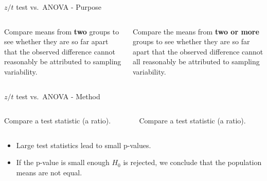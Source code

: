 \documentclass[
  ignorenonframetext,
]{beamer}
\begin{document}
\begin{frame}{\(z/t\) test vs.~ANOVA - Purpose}
\protect\hypertarget{zt-test-vs.-anova---purpose}{}
\begin{columns}

\begin{column}{0.45\textwidth}

\raggedright Compare means from \textbf{two} groups to see whether they are so far apart that the observed difference cannot reasonably be attributed to sampling variability.


\end{column}

\begin{column}{0.45\textwidth}

\raggedright Compare the means from \textbf{two or more} groups to see whether they are so far apart that the observed difference cannot all reasonably be attributed to sampling variability.


\end{column}

\end{columns}
\end{frame}

\begin{frame}{\(z/t\) test vs.~ANOVA - Method}
\protect\hypertarget{zt-test-vs.-anova---method}{}
\begin{columns}

\begin{column}{0.45\textwidth}

\raggedright Compare a test statistic (a ratio).


\end{column}

\begin{column}{0.45\textwidth}

\raggedright Compare a test statistic (a ratio).


\end{column}

\end{columns}

\pause

\begin{itemize}
\item
  Large test statistics lead to small p-values.
\item
  If the p-value is small enough \(H_0\) is rejected, we conclude that
  the population means are not equal.
\end{itemize}
\end{frame}
\end{document}
